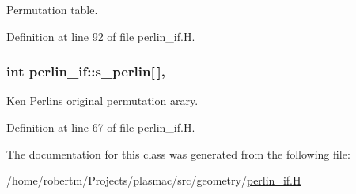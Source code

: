 Permutation table. 



Definition at line 92 of file perlin\+\_\+if.\+H.

\subsubsection[{\texorpdfstring{s\+\_\+perlin}{s_perlin}}]{\setlength{\rightskip}{0pt plus 5cm}int perlin\+\_\+if\+::s\+\_\+perlin\mbox{[}$\,$\mbox{]}\hspace{0.3cm}{\ttfamily [static]}, {\ttfamily [protected]}}\hypertarget{classperlin__if_a2a43aaafd08ae4216f9e89cf4d560e64}{}\label{classperlin__if_a2a43aaafd08ae4216f9e89cf4d560e64}


Ken Perlin\textquotesingle{}s original permutation arary. 



Definition at line 67 of file perlin\+\_\+if.\+H.



The documentation for this class was generated from the following file\+:\begin{DoxyCompactItemize}
\item 
/home/robertm/\+Projects/plasmac/src/geometry/\hyperlink{perlin__if_8H}{perlin\+\_\+if.\+H}\end{DoxyCompactItemize}
